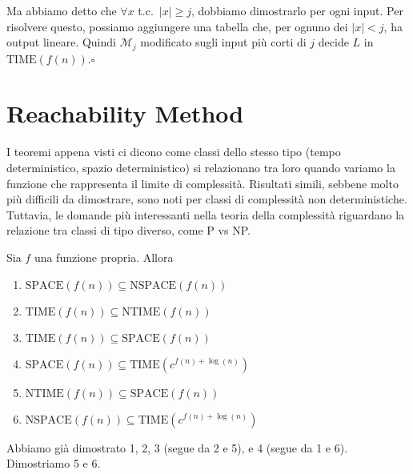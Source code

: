Ma abbiamo detto che $\forall x$ t.c.~$|x|\geq j$, dobbiamo dimostrarlo per ogni input. Per risolvere questo, possiamo aggiungere una tabella che, per ognuno dei $|x|<j$, ha output lineare. Quindi $\mathcal{M}_j$ modificato sugli input più corti di $j$ decide $L$ in $\text{TIME}(f(n))$.\hfill $\square$\medskip



\section{Reachability Method}
I teoremi appena visti ci dicono come classi dello stesso tipo (tempo deterministico, spazio deterministico) si relazionano tra loro quando variamo la funzione che rappresenta il limite di complessità. Risultati simili, sebbene molto più difficili da dimostrare, sono noti per classi di complessità non deterministiche. Tuttavia, le domande più interessanti nella teoria della complessità riguardano la relazione tra classi di tipo diverso, come P vs NP.
\begin{theorem}
    Sia $f$ una funzione propria. Allora
    \begin{enumerate}
        \item $\text{SPACE}(f(n))\subseteq\text{NSPACE}(f(n))$
        \item $\text{TIME}(f(n))\subseteq\text{NTIME}(f(n))$
        \item $\text{TIME}(f(n))\subseteq\text{SPACE}(f(n))$
        \item $\text{SPACE}(f(n))\subseteq\text{TIME}(c^{f(n)+\log(n)})$
        \item $\text{NTIME}(f(n))\subseteq\text{SPACE}(f(n))$
        \item $\text{NSPACE}(f(n))\subseteq\text{TIME}(c^{f(n)+\log(n)})$
    \end{enumerate}
\end{theorem}
Abbiamo già dimostrato 1, 2, 3 (segue da 2 e 5), e 4 (segue da 1 e 6). Dimostriamo 5 e 6.

